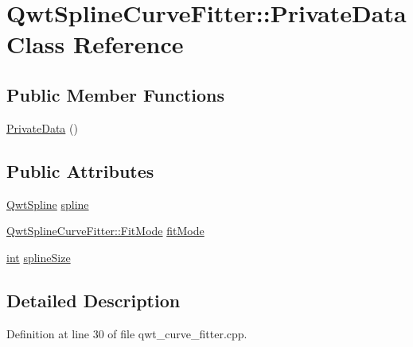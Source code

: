 \hypertarget{class_qwt_spline_curve_fitter_1_1_private_data}{\section{Qwt\-Spline\-Curve\-Fitter\-:\-:Private\-Data Class Reference}
\label{class_qwt_spline_curve_fitter_1_1_private_data}
}
\subsection*{Public Member Functions}
\begin{DoxyCompactItemize}
\item 
\hyperlink{class_qwt_spline_curve_fitter_1_1_private_data_a77896f7e5dfd8ef7158f050cd1cbe700}{Private\-Data} ()
\end{DoxyCompactItemize}
\subsection*{Public Attributes}
\begin{DoxyCompactItemize}
\item 
\hyperlink{class_qwt_spline}{Qwt\-Spline} \hyperlink{class_qwt_spline_curve_fitter_1_1_private_data_aa21b2004a0a6b96ece6994cc2397d3eb}{spline}
\item 
\hyperlink{class_qwt_spline_curve_fitter_a8c5e6858f885b5691c30092a950879a8}{Qwt\-Spline\-Curve\-Fitter\-::\-Fit\-Mode} \hyperlink{class_qwt_spline_curve_fitter_1_1_private_data_a3642a60e60fbb8e2b01e3ef5407a75f7}{fit\-Mode}
\item 
\hyperlink{ioapi_8h_a787fa3cf048117ba7123753c1e74fcd6}{int} \hyperlink{class_qwt_spline_curve_fitter_1_1_private_data_a2a220c6b2e8d05557779d818e8ffb321}{spline\-Size}
\end{DoxyCompactItemize}


\subsection{Detailed Description}


Definition at line 30 of file qwt\-\_\-curve\-\_\-fitter.\-cpp.



